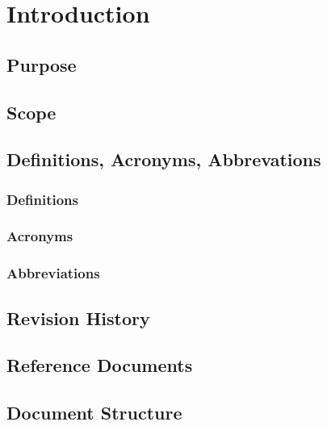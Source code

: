\section{Introduction}
\subsection{Purpose}
\subsection{Scope}
\subsection{Definitions, Acronyms, Abbrevations}
\subsubsection{Definitions}
\subsubsection{Acronyms}
\subsubsection{Abbreviations}
\subsection{Revision History}
\subsection{Reference Documents}
\subsection{Document Structure}
